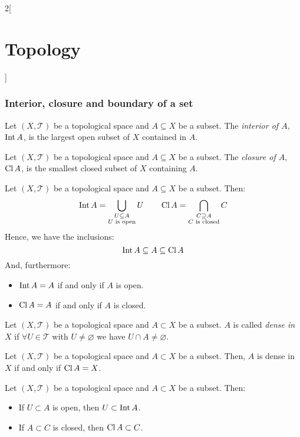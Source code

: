 \documentclass[../../../main.tex]{subfiles}
\begin{document}
\begin{multicols}{2}[\section{Topology}]
  \subsubsection{Interior, closure and boundary of a set}
  \begin{definition}[Interior]
    Let $(X,\mathcal{T})$ be a topological space and $A\subseteq X$ be a subset. The \textit{interior of $A$}, $\operatorname{Int} A$, is the largest open subset of $X$ contained in $A$.
  \end{definition}
  \begin{definition}[Closure]
    Let $(X,\mathcal{T})$ be a topological space and $A\subseteq X$ be a subset. The \textit{closure of $A$}, $\operatorname{Cl} A$, is the smallest closed subset of $X$ containing $A$.
  \end{definition}
  \begin{prop}
    Let $(X,\mathcal{T})$ be a topological space and $A\subseteq X$ be a subset. Then: $$\operatorname{Int} A=\bigcup_{\substack{U\subseteq A\\U\text{ is open}}}U\qquad\operatorname{Cl} A=\bigcap_{\substack{C\supseteq A\\C\text{ is closed}}}C$$
    Hence, we have the inclusions: $$\operatorname{Int} A\subseteq A\subseteq \operatorname{Cl} A$$
    And, furthermore:
    \begin{itemize}
      \item $\operatorname{Int} A=A$ if and only if $A$ is open.
      \item $\operatorname{Cl} A=A$ if and only if $A$ is closed.
    \end{itemize}
  \end{prop}
  \begin{definition}
    Let $(X,\mathcal{T})$ be a topological space and $A\subset X$ be a subset. $A$ is called \textit{dense in $X$} if $\forall U\in\mathcal{T}$ with $U\ne\varnothing$ we have $U\cap A\ne\varnothing$.
  \end{definition}
  \begin{prop}
    Let $(X,\mathcal{T})$ be a topological space and $A\subset X$ be a subset. Then, $A$ is dense in $X$ if and only if $\operatorname{Cl} A=X$.
  \end{prop}
  \begin{prop}
    Let $(X,\mathcal{T})$ be a topological space and $A\subset X$ be a subset. Then:
    \begin{itemize}
      \item If $U\subset A$ is open, then $U\subset\operatorname{Int} A$.
      \item If $A\subset C$ is closed, then $\operatorname{Cl} A\subset C$.
    \end{itemize}

\end{prop}
\end{multicols}
\end{document}
